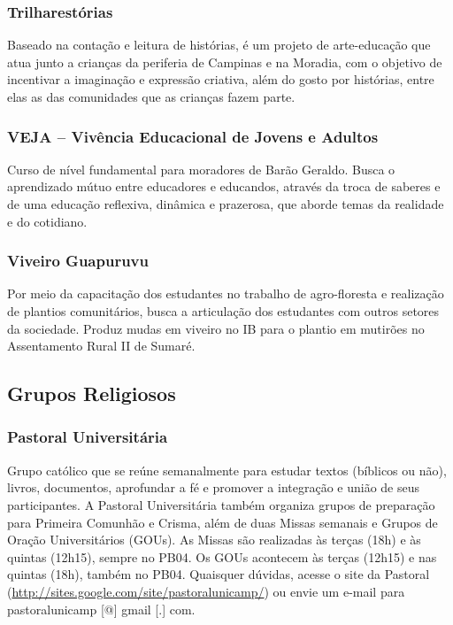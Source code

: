 \subsubsection{Trilharestórias}

Baseado na contação e leitura de histórias, é um projeto de arte-educação que
atua junto a crianças da periferia de Campinas e na Moradia, com o objetivo de
incentivar a imaginação e expressão criativa, além do gosto por histórias, entre
elas as das comunidades que as crianças fazem parte.

\subsubsection{VEJA -- Vivência Educacional de Jovens e Adultos}

Curso de nível fundamental para moradores de Barão Geraldo. Busca o aprendizado
mútuo entre educadores e educandos, através da troca de saberes e de uma
educação reflexiva, dinâmica e prazerosa, que aborde temas da realidade e do
cotidiano.

\subsubsection{Viveiro Guapuruvu}

Por meio da capacitação dos estudantes no trabalho de agro-floresta e realização
de plantios comunitários, busca a articulação dos estudantes com outros setores
da sociedade. Produz mudas em viveiro no IB para o plantio em mutirões no
Assentamento Rural II de Sumaré.

\subsection{Grupos Religiosos}
\subsubsection{Pastoral Universitária}

Grupo católico que se reúne semanalmente para estudar textos (bíblicos ou não),
livros, documentos, aprofundar a fé e promover a integração e união de seus
participantes. A Pastoral Universitária também organiza grupos de preparação
para Primeira Comunhão e Crisma, além de duas Missas semanais e Grupos de Oração
Universitários (GOUs). As Missas são realizadas às terças (18h) e às
quintas (12h15), sempre no PB04. Os GOUs acontecem às terças (12h15) e
nas quintas (18h), também no PB04. Quaisquer dúvidas, acesse o site da
Pastoral (\url{http://sites.google.com/site/pastoralunicamp/}) ou
envie um e-mail para pastoralunicamp [@] gmail [.] com.

